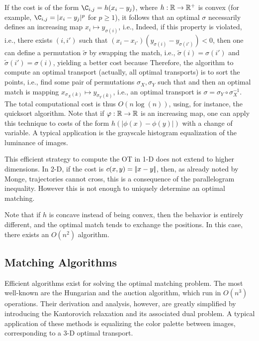 If the cost is of the form $\C_{i,j}=h(x_i-y_j)$, where $h: \mathbb{R} \rightarrow \mathbb{R}^+$ is convex (for example, $\C_{i,j}=|x_i-y_j|^p$ for $p \geq 1$), it follows that an optimal $\sigma$ necessarily defines an increasing map $x_i \mapsto y_{\sigma(i)}$, i.e.,
Indeed, if this property is violated, i.e., there exists $(i,i')$ such that $(x_i-x_{i'})(y_{\sigma(i)}-y_{\sigma(i')}) < 0$, then one can define a permutation $\tilde{\sigma}$ by swapping the match, i.e., $\tilde{\sigma}(i)=\sigma(i')$ and $\tilde{\sigma}(i')=\sigma(i)$, yielding a better cost
because
Therefore, the algorithm to compute an optimal transport (actually, all optimal transports) is to sort the points, i.e., find some pair of permutations $\sigma_X, \sigma_Y$ such that
and then an optimal match is mapping $x_{\sigma_X(k)} \mapsto y_{\sigma_Y(k)}$, i.e., an optimal transport is $\sigma = \sigma_Y \circ \sigma_X^{-1}$. The total computational cost is thus $O(n\log(n))$, using, for instance, the quicksort algorithm.
%
Note that if $\varphi : \mathbb{R} \rightarrow \mathbb{R}$ is an increasing map, one can apply this technique to costs of the form $h(|\phi(x)-\phi(y)|)$ with a change of variable.
%
A typical application is the grayscale histogram equalization of the luminance of images.

This efficient strategy to compute the OT in 1-D does not extend to higher dimensions. In 2-D, if the cost is $c(x,y) = |\!| x-y |\!|$, then, as already noted by Monge, trajectories cannot cross, this is a consequence of the parallelogram inequality. However this is not enough to uniquely determine an optimal matching. 

Note that if $h$ is concave instead of being convex, then the behavior is entirely different, and the optimal match tends to exchange the positions. In this case, there exists an $O(n^2)$ algorithm.



\subsection{Matching Algorithms}

Efficient algorithms exist for solving the optimal matching problem. The most well-known are the Hungarian and the auction algorithm, which run in $O(n^3)$ operations. Their derivation and analysis, however, are greatly simplified by introducing the Kantorovich relaxation and its associated dual problem.
%
A typical application of these methods is equalizing the color palette between images, corresponding to a 3-D optimal transport.
